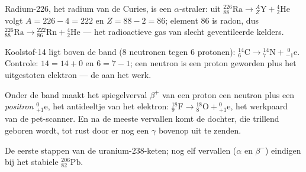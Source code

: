 \begin{example}\label{ex:g11:nucleus-radioactivity:alpha}
Radium-226, het radium van de Curies, is een $\alpha$-straler: uit
${}^{226}_{88}\mathrm{Ra} \to {}^{A}_{Z}\mathrm{Y} + {}^{4}_{2}\mathrm{He}$
volgt $A = 226 - 4 = 222$ en $Z = 88 - 2 = 86$; element $86$ is radon, dus
${}^{226}_{88}\mathrm{Ra} \to {}^{222}_{86}\mathrm{Rn} + {}^{4}_{2}\mathrm{He}$
--- het radioactieve gas van slecht geventileerde kelders.
\end{example}

\begin{example}\label{ex:g11:nucleus-radioactivity:beta}
Koolstof-14 ligt boven de band ($8$ neutronen tegen $6$ protonen):
${}^{14}_{6}\mathrm{C} \to {}^{14}_{7}\mathrm{N} + {}^{\;0}_{-1}\mathrm{e}$.
Controle: $14 = 14 + 0$ en $6 = 7 - 1$; een neutron is een proton geworden
plus het uitgestoten elektron --- de  aan het werk.
\end{example}

\begin{remark}\label{rem:g11:nucleus-radioactivity:betaplus}
Onder de band maakt het spiegelverval $\beta^+$ van een proton een neutron
plus een \emph{positron} ${}^{0}_{+1}\mathrm{e}$, het
antideeltje van het elektron:
${}^{18}_{9}\mathrm{F} \to {}^{18}_{8}\mathrm{O} + {}^{0}_{+1}\mathrm{e}$,
het werkpaard van de pet-scanner. En na de meeste vervallen komt de
dochter, die trillend geboren wordt, tot rust door er nog een $\gamma$
bovenop uit te zenden.
\end{remark}

\begin{omfigure}

{\small De eerste stappen van de uranium-238-keten; nog elf vervallen
($\alpha$ en $\beta^-$) eindigen bij het stabiele
${}^{206}_{82}\mathrm{Pb}$.}
\end{omfigure}

